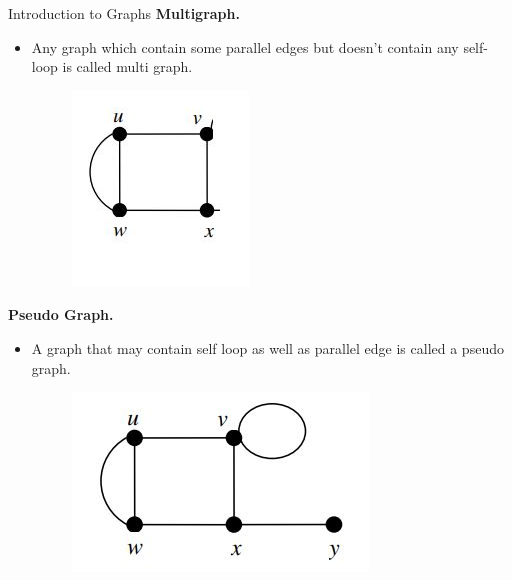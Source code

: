 \documentclass{beamer}
\begin{document}
\begin{frame}{Introduction to Graphs}
	\textbf{ Multigraph.}
	\begin{itemize}
		\item Any graph which contain some parallel edges but doesn’t contain any self-loop is called multi graph. 
		\begin{figure}
			\includegraphics[scale=.5]{img/m4}
		\end{figure}
	\end{itemize}
	\textbf{Pseudo Graph.}
	\begin{itemize}
		\item A graph that may contain self loop as well as parallel edge is called a pseudo graph.
		\begin{figure}
			\includegraphics[scale=.5]{img/m6}
		\end{figure}
	\end{itemize}
\end{frame}
\end{document}
